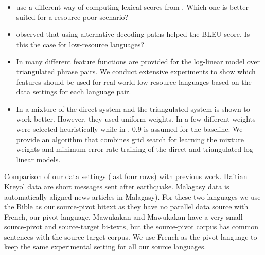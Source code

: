 \documentclass[11pt]{article}
\begin{document}
\begin{itemize}\addtolength{\itemsep}{-0.4\baselineskip}
	\item \cite{Utiyama:07} use a different way of computing lexical scores from \cite{Cohn:07}. Which one is better suited for a resource-poor scenario?
  \item \cite{Bertoldi:08} observed that using alternative decoding paths helped the BLEU score. Is this the case for low-resource languages?
	\item In \cite{Utiyama:07,Cohn:07,Nakovemnlp:12,Wuwang:07} many different feature functions are provided for the log-linear model over triangulated phrase pairs. We conduct extensive experiments to show which features should be used for real world low-resource languages based on the data settings for each language pair.
	\item In \cite{Cohn:07} a mixture of the direct system and the triangulated system is shown to work better. However, they used uniform weights. In \cite{Nakovemnlp:12} a few different weights were selected heuristically while in \cite{Wuwang:07}, 0.9 is assumed for the baseline. We provide an algorithm that combines grid search for learning the mixture weights and minimum error rate training of the direct and triangulated log-linear models. 
\end{itemize}

\begin{table}[!ht]
	\small
	\centering
	
	\caption{Comparison of our data settings (last four rows) with previous work. Haitian Kreyol data are short messages sent after earthquake. Malagasy data is automatically aligned news articles in Malagasy). For these two languages we use the Bible as our source-pivot bitext as they have no parallel data source with French, our pivot language. Mawukakan and Mawukakan have a very small source-pivot and source-target bi-texts, but the source-pivot corpus has common sentences with the source-target corpus. We use French as the pivot language to keep the same experimental setting for all our source languages.}
	\label{table:datasettings_differences}
\end{table}
\end{document}
